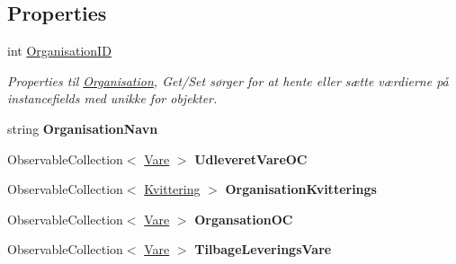 \subsection*{Properties}
\begin{DoxyCompactItemize}
\item 
int \mbox{\hyperlink{class_r_f_storage_1_1_model_1_1_organisation_af36bde5b1924a1de8a9f141a18529993}{Organisation\+ID}}
\begin{DoxyCompactList}\small\item\em Properties til \mbox{\hyperlink{class_r_f_storage_1_1_model_1_1_organisation}{Organisation}}, Get/\+Set sørger for at hente eller sætte værdierne på instancefields med unikke for objekter. \end{DoxyCompactList}\item 
\mbox{\label{class_r_f_storage_1_1_model_1_1_organisation_ae81ef67c0f22073070fbf11f6b6835db}} 
string {\bfseries Organisation\+Navn}
\item 
\mbox{\label{class_r_f_storage_1_1_model_1_1_organisation_a58fb241af04e2a6ee0aae839acdceae6}} 
Observable\+Collection$<$ \mbox{\hyperlink{class_r_f_storage_1_1_model_1_1_vare}{Vare}} $>$ {\bfseries Udleveret\+Vare\+OC}
\item 
\mbox{\label{class_r_f_storage_1_1_model_1_1_organisation_a2e34fbd71a6ef72c0ce7e63a6ecb7481}} 
Observable\+Collection$<$ \mbox{\hyperlink{class_r_f_storage_1_1_model_1_1_kvittering}{Kvittering}} $>$ {\bfseries Organisation\+Kvitterings}
\item 
\mbox{\label{class_r_f_storage_1_1_model_1_1_organisation_ae8fd25056cb4e44943735b8572695bd5}} 
Observable\+Collection$<$ \mbox{\hyperlink{class_r_f_storage_1_1_model_1_1_vare}{Vare}} $>$ {\bfseries Organsation\+OC}
\item 
\mbox{\label{class_r_f_storage_1_1_model_1_1_organisation_af01b38832fc4704807fd2ee7b915d8a2}} 
Observable\+Collection$<$ \mbox{\hyperlink{class_r_f_storage_1_1_model_1_1_vare}{Vare}} $>$ {\bfseries Tilbage\+Leverings\+Vare}
\end{DoxyCompactItemize}


